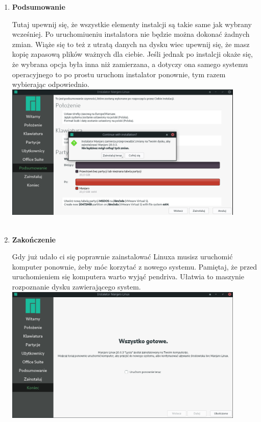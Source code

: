 \documentclass[10pt,a4paper]{report}
\begin{document}
\begin{enumerate}
\item \textbf{Podsumowanie} \par
Tutaj upewnij się, że wszystkie elementy instalcji są takie same jak wybrany wcześniej. Po uruchomiueniu instalatora nie będzie można dokonać żadnych zmian. Wiąże się to też z utratą danych na dysku wiec upewnij się, że masz kopię zapasową plików ważnych dla ciebie. Jeśli jednak po instalcji okaże się, że wybrana opcja była inna niż zamierzana, a dotyczy ona samego systemu operacyjnego to po prostu uruchom instalator ponownie, tym razem wybierając odpowiednio.\\

\includegraphics[width=0.9\textwidth, center]{manjaro_install11.png}\\\\

\item \textbf{Zakończenie} \par
Gdy już udało ci się poprawnie zainstalować Linuxa musisz uruchomić komputer ponownie, żeby móc korzytać z nowego systemu. Pamiętaj, że przed uruchomieniem się komputera warto wyjąć pendriva. Ułatwia to maszynie rozpoznanie dysku zawierającego system.\\

\includegraphics[width=0.9\textwidth, center]{manjaro_install13.png}\\\\\\

\end{enumerate}
 
\end{document}
